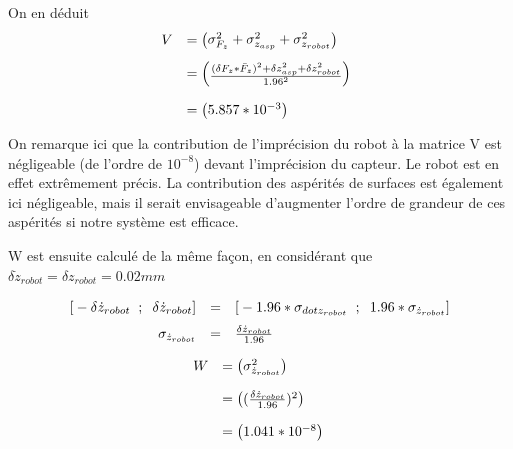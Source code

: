 \documentclass[12pt,twoside,a4paper]{article}
\begin{document}
\vspace{1cm}
On en déduit
$$
\begin{array}{ll}
V &= \begin{pmatrix}
\sigma_{F_{z}}^{2} +  \sigma_{z_{asp}}^{2} +  \sigma_{z_{robot}}^{2} 
\end{pmatrix} \\
&=  \begin{pmatrix}
\frac{(\delta F_{z}*\bar{F}_{z})^{2}+\delta z_{asp}^{2}+\delta z_{robot}^{2}}{1.96^{2}}
\end{pmatrix} \rule{0pt}{20pt} \\
&= \begin{pmatrix} 5.857*10^{-3} \end{pmatrix} \rule{0pt}{20pt}
\end{array}
$$

On remarque ici que la contribution de l'imprécision du robot à la matrice V est négligeable (de l'ordre de $10^{-8}$) devant l'imprécision du capteur. Le robot est en effet extrêmement précis. La contribution des aspérités de surfaces est également ici négligeable, mais il serait envisageable d'augmenter l'ordre de grandeur de ces aspérités si notre système est efficace.  



\vspace{2cm}

W est ensuite calculé de la même façon, en considérant que $\delta \dot{z}_{robot} = \delta z_{robot} = 0.02mm$

$$
\begin{array}{rcl}
	\text{[} -\delta \dot{z}_{robot} \rule{2mm}{0pt}; \rule{2mm}{0pt} \delta \dot{z}_{robot} \text{]} &=& \text{[}-1.96*\sigma_{dot{z}_{robot}} \rule{2mm}{0pt}; \rule{2mm}{0pt} 1.96*\sigma_{\dot{z}_{robot}}  \text{]} \\
	\sigma_{\dot{z}_{robot}} &= & \frac{\delta\dot{z}_{robot}}{1.96} \rule{0pt}{15pt} \\
\end{array}
$$

$$
\begin{array}{ll}
W &=
\begin{pmatrix}
 \sigma_{\dot{z}_{robot}}^{2} 
\end{pmatrix} \\
&=
\begin{pmatrix}
(\frac{\delta\dot{z}_{robot}}{1.96})^{2}
\end{pmatrix} \rule{0pt}{20pt} \\ 
&= \begin{pmatrix} 1.041*10^{-8} \end{pmatrix} \rule{0pt}{20pt} \\ 
\end{array}
$$
\end{document}
